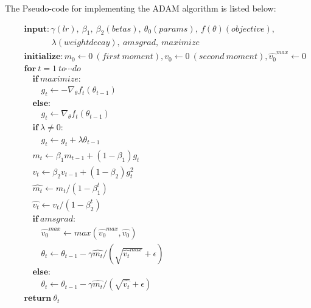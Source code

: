 The Pseudo-code for implementing the ADAM algorithm is listed below:

\begin{eqnarray}
    && \textbf{input}: \gamma(lr),\ \beta_1,\ \beta_2(betas),\ \theta_0(params),\ f(\theta)(objective),\  \nonumber \\
    && \qquad \quad \ \lambda(weight decay),\ amsgrad,\ maximize \nonumber \\
    && \textbf{initialize}: m_0 \leftarrow 0\ (first\ moment), v_0 \leftarrow 0\ (second\ moment), \hat{v_0}^{max} \leftarrow 0  \nonumber \\
    && \textbf{for}\ t=1\ to \cdots do \nonumber \\ 
    && \quad \textbf{if}\ maximize: \nonumber \\ 
    && \quad \quad  g_t \leftarrow -\nabla_\theta f_t(\theta_{t-1}) \nonumber \\ 
    && \quad \textbf{else}: \nonumber \\ 
    && \quad \quad  g_t \leftarrow \nabla_\theta f_t(\theta_{t-1}) \nonumber \\ 
    && \quad \textbf{if}\ \lambda \neq 0: \nonumber \\ 
    && \quad \quad  g_t \leftarrow g_t + \lambda \theta_{t-1} \nonumber \\ 
    && \quad  m_t \leftarrow \beta_1 m_{t-1} + (1-\beta_1)g_t  \nonumber \\ 
    && \quad  v_t \leftarrow \beta_2 v_{t-1} + (1-\beta_2)g_t^2  \nonumber \\ 
    && \quad  \hat{m_t} \leftarrow m_t / (1-\beta_1^t)  \nonumber \\ 
    && \quad  \hat{v_t} \leftarrow v_t / (1-\beta_2^t)  \nonumber \\ 
    && \quad \textbf{if}\ amsgrad: \nonumber \\ 
    && \quad \quad \hat{v_0}^{max} \leftarrow max(\hat{v_0}^{max}, \hat{v_0}) \nonumber \\ 
    && \quad \quad \theta_t \leftarrow \theta_{t-1} - \gamma \hat{m_t} /(\sqrt{\hat{v_t}^{max}} + \epsilon) \nonumber \\ 
    && \quad \textbf{else}: \nonumber \\ 
    && \quad \quad \theta_t \leftarrow \theta_{t-1} - \gamma \hat{m_t} /(\sqrt{\hat{v_t}} + \epsilon) \nonumber \\ 
    && \textbf{return} \ \theta_t \nonumber \\ 
\end{eqnarray}

